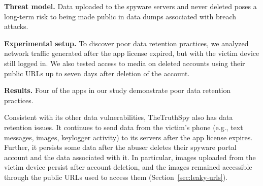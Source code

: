 \documentclass[sigconf,balance=false]{acmart}
\newcommand{\sumanth}[1]{\textcolor{violet}{\noindent[SR: #1]}}
\newcommand{\geoff}[1]{\textcolor{purple}{\noindent[GV: #1]}}
\newcommand{\sumanth}[1]{}
\newcommand{\geoff}[1]{}
\begin{document}
\textbf{Threat model.} Data uploaded to the spyware servers and never deleted poses a long-term risk to being made public in data dumps associated with breach attacks.

\textbf{Experimental setup.}  To discover poor data retention practices, we analyzed network traffic generated after the app license expired, but with the victim device still logged in.  We also tested
access to media on deleted accounts using their public URLs up to
seven days after deletion of the account.


\textbf{Results.}  Four of the apps in our study demonstrate poor data retention practices.

Consistent with its other data vulnerabilities,
TheTruthSpy also has data retention issues.
It continues to send
data from the victim's phone (e.g., text messages, images, keylogger
activity) to its servers after the app license expires. Further, it persists some data after the abuser
deletes their spyware portal account and the data associated with it.
%
%
In particular, images uploaded from the victim device persist after
account deletion, and the images remained accessible through the
public URLs used to access them (Section~\ref{sec:leaky-urls}).

\end{document}

